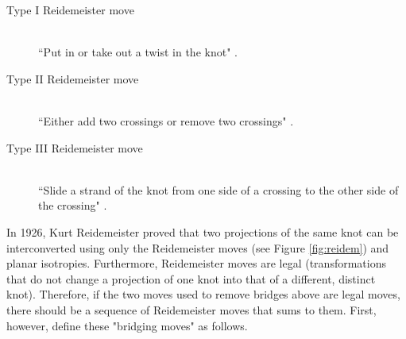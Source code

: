 \documentclass[titlepage]{article}
\newcommand{\dq}[4][]{``#2"#1 \cite[#4]{#3}.}
\begin{document}
\begin{defi}
    \begin{description}
        \item[Type I Reidemeister move] \hfill \\ \dq{Put in or take out a twist in the knot}{bib:knotbook}{13}
        \item[Type II Reidemeister move] \hfill \\ \dq{Either add two crossings or remove two crossings}{bib:knotbook}{13}
        \item[Type III Reidemeister move] \hfill \\ \dq{Slide a strand of the knot from one side of a crossing to the other side of the crossing}{bib:knotbook}{13}
    \end{description}
\end{defi}

In 1926, Kurt Reidemeister proved that two projections of the same knot can be interconverted using only the Reidemeister moves (see Figure \ref{fig:reidem}) and planar isotropies. Furthermore, Reidemeister moves are legal (transformations that do not change a projection of one knot into that of a different, distinct knot). Therefore, if the two moves used to remove bridges above are legal moves, there should be a sequence of Reidemeister moves that sums to them. First, however, define these "bridging moves" as follows.\par
\end{document}

